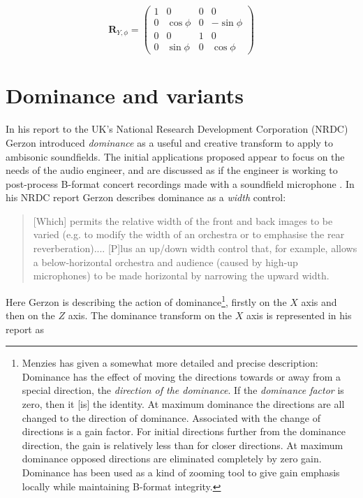 \documentclass[12pt]{article}
\begin{document}
\begin{equation}	\label{eq:tumble}
\mathbf{R}_{Y, \phi} = \begin{pmatrix}
	1 & 0 & 0 & 0\\
	0 & \cos{\phi}  & 0 & -\sin{\phi}\\
	0 & 0 & 1 & 0\\
	0 & \sin{\phi}  & 0 & \cos{\phi}
\end{pmatrix}
\end{equation}

\section{Dominance and variants}
\label{sec:dominance}

In his report to the UK's National Research Development Corporation (NRDC) \cite{gerzon:75a} Gerzon introduced {\em dominance} as a useful and creative transform to apply to ambisonic soundfields. The initial applications proposed appear to focus on the needs of the audio engineer, and are discussed as if the engineer is working to post-process B-format concert recordings made with a soundfield microphone \cite{farrar:79}. In his NRDC report Gerzon describes dominance as a {\em width} control: \begin{quote}
[Which] permits the relative width of the front and back images to be varied (e.g. to modify the width of an orchestra or to emphasise the rear reverberation).... [P]lus an up/down width control that, for example, allows a below-horizontal orchestra and audience (caused by high-up microphones) to be made horizontal by narrowing the upward width.
\end{quote} Here Gerzon is describing the action of dominance\footnote{Menzies \cite{menzies:99} has given a somewhat more detailed and precise description: Dominance has the effect of moving the directions towards or away from a special direction, the {\em direction of the dominance}. If the {\em dominance factor} is zero, then it [is] the identity. At maximum dominance the directions are all changed to the direction of dominance. Associated with the change of directions is a gain factor. For initial directions further from the dominance direction, the gain is relatively less than for closer directions. At maximum dominance opposed directions are eliminated completely by zero gain. Dominance has been used as a kind of zooming tool to give gain emphasis locally while maintaining B-format integrity. }, firstly on the \(X\) axis and then on the \(Z\) axis. The dominance transform on the \(X\) axis is represented in his report as \begin{equation}	\label{eq:mu_dom}

\end{equation}
\end{document}
